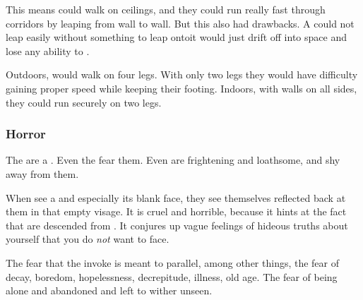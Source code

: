 This means \lesserbanes could walk on ceilings, and they could run really fast through corridors by leaping from wall to wall. 
But this also had drawbacks. 
A \bane could not leap easily without something to leap onto\dash it would just drift off into space and lose any ability to \manoeuvre. 

Outdoors, \lesserbanes would walk on four legs. 
With only two legs they would have difficulty gaining proper speed while keeping their footing. 
Indoors, with walls on all sides, they could run securely on two legs. 





\subsubsection{Horror}
The \banes{} are a . 
Even the \resphain{} fear them. 
Even \lesserbanes{} are frightening and loathsome, and \resphain{} shy away from them.

When \humans{} see a \bane{} and especially its blank face, they see themselves reflected back at them in that empty visage. 
It is cruel and horrible, because it hints at the fact that \humans{} are descended from \banes. 
It conjures up vague feelings of hideous truths about yourself that you do \emph{not} want to face. 

The fear that the \banes{} invoke is meant to parallel, among other things, the fear of decay, boredom, hopelessness, decrepitude, illness, old age.
The fear of being alone and abandoned and left to wither unseen. 


